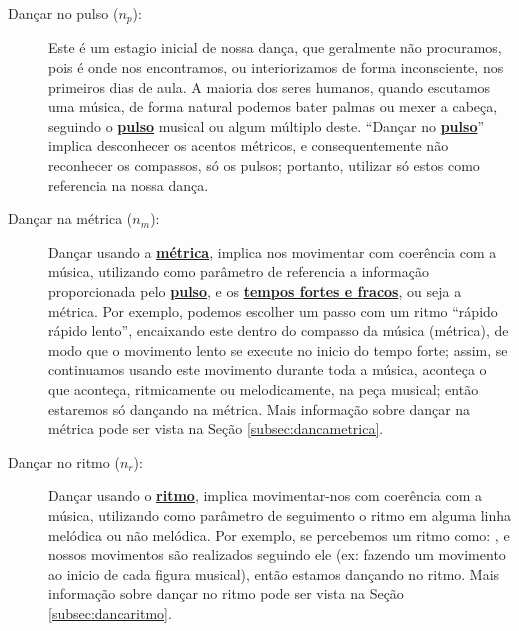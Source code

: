 \begin{description}

\item[Dançar no pulso ($n_p$):] Este é um estagio inicial de nossa dança, 
que geralmente não procuramos, 
pois é onde nos encontramos, ou interiorizamos de forma inconsciente, nos primeiros dias de aula.
A maioria dos seres humanos, quando escutamos uma música, 
de forma natural podemos bater palmas ou mexer a cabeça, 
seguindo o \hyperref[ref:Pulso]{\textbf{pulso}} musical ou algum múltiplo deste. 
``Dançar no \hyperref[ref:Pulso]{\textbf{pulso}}''
implica desconhecer os acentos métricos,
e consequentemente não reconhecer os compassos, só os pulsos;
portanto, utilizar só estos como referencia na nossa dança. 
\item[Dançar na métrica ($n_m$):] 
Dançar usando a \hyperref[def:Metrica]{\textbf{métrica}}, 
implica nos movimentar com coerência com a música, 
utilizando como parâmetro de referencia a informação proporcionada pelo \hyperref[ref:Pulso]{\textbf{pulso}}, 
e os \hyperref[subsec:acentuacion1]{\textbf{tempos fortes e fracos}}, ou seja a métrica.
Por exemplo, podemos escolher um passo com um ritmo ``rápido rápido lento'',
encaixando este dentro do compasso da música (métrica),
de modo que o movimento lento se execute no inicio do tempo forte; 
assim, se continuamos usando este movimento durante toda a música,
aconteça o que aconteça, ritmicamente ou melodicamente, na peça musical;
então estaremos só dançando na métrica.
Mais informação sobre dançar na métrica pode ser vista na Seção \ref{subsec:dancametrica}.


\item[Dançar no ritmo  ($n_r$):] Dançar usando o \hyperref[sec:pos:Ritmo]{\textbf{ritmo}},
implica movimentar-nos com coerência com a música, 
utilizando como parâmetro de seguimento 
o ritmo em alguma linha melódica ou não melódica.
Por exemplo, se percebemos  um ritmo como: \Vier \Acht \Vier  \Acht \Vier \Halb,
e nossos movimentos são realizados seguindo ele 
(ex: fazendo um movimento ao inicio de cada figura musical), então estamos dançando no ritmo.
Mais informação sobre dançar no ritmo pode ser vista na Seção \ref{subsec:dancaritmo}.
 

\end{description}
